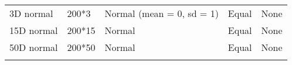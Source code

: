 \documentclass[]{article}
\begin{document}
\begin{longtable}[]{@{}lllll@{}}
\begin{minipage}[t]{0.12\columnwidth}\raggedright\strut
3D normal\strut
\end{minipage} & \begin{minipage}[t]{0.08\columnwidth}\raggedright\strut
200*3\strut
\end{minipage} & \begin{minipage}[t]{0.31\columnwidth}\raggedright\strut
Normal (mean = 0, sd = 1)\strut
\end{minipage} & \begin{minipage}[t]{0.21\columnwidth}\raggedright\strut
Equal\strut
\end{minipage} & \begin{minipage}[t]{0.13\columnwidth}\raggedright\strut
None\strut
\end{minipage}\tabularnewline
\begin{minipage}[t]{0.12\columnwidth}\raggedright\strut
15D normal\strut
\end{minipage} & \begin{minipage}[t]{0.08\columnwidth}\raggedright\strut
200*15\strut
\end{minipage} & \begin{minipage}[t]{0.31\columnwidth}\raggedright\strut
Normal\strut
\end{minipage} & \begin{minipage}[t]{0.21\columnwidth}\raggedright\strut
Equal\strut
\end{minipage} & \begin{minipage}[t]{0.13\columnwidth}\raggedright\strut
None\strut
\end{minipage}\tabularnewline
\begin{minipage}[t]{0.12\columnwidth}\raggedright\strut
50D normal\strut
\end{minipage} & \begin{minipage}[t]{0.08\columnwidth}\raggedright\strut
200*50\strut
\end{minipage} & \begin{minipage}[t]{0.31\columnwidth}\raggedright\strut
Normal\strut
\end{minipage} & \begin{minipage}[t]{0.21\columnwidth}\raggedright\strut
Equal\strut
\end{minipage} & \begin{minipage}[t]{0.13\columnwidth}\raggedright\strut
None\strut
\end{minipage}\tabularnewline
\begin{minipage}[t]{0.12\columnwidth}\raggedright\strut

\end{minipage}
\end{longtable}
\end{document}
